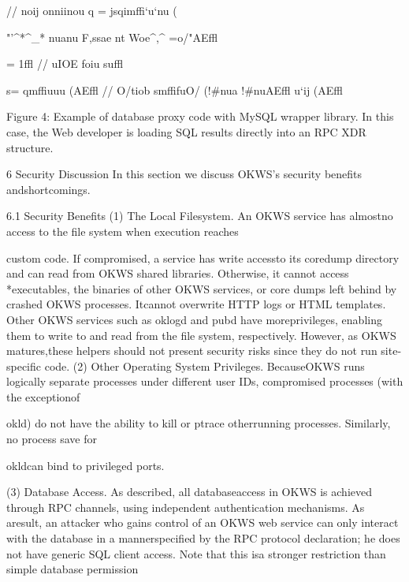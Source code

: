 // \Lambda n\Phi  o\Phi ij o\Lambda \Lambda \Theta \Delta  n\Gamma  \Upsilon \Phi \Upsilon \Gamma \Upsilon ni\Upsilon in\Gamma \Upsilon o\Phi  \Gamma \Upsilon \Omega u
q = \Omega jsqimffi`\Delta u`n\Delta u (

"'^*^_* n\Psi ua\Phi n\Omega u F,ssae \Gamma nt Woe^,^ \Upsilon \Sigma =o/"AEffl

\Upsilon \Sigma  = 1ffl // \Psi u\Gamma  IOE f\Delta o\Omega  \Lambda i\Upsilon u\Phi \Gamma 
\Theta su\Delta \Xi \Pi \Sigma \Delta \Xi \Gamma  \Theta ffl

s\Gamma \Omega \Gamma  = qmffiu\Pi u\Lambda \Theta \Gamma u (\Upsilon \Sigma AEffl // \Omega \Upsilon \Psi O/\Gamma  tio\Lambda b
s\Gamma \Omega \Gamma mffifu\Gamma \Lambda O/ (!\Theta #n\Psi ua !\Theta #\Phi n\Omega uAEffl
\Delta u`ij (\Theta AEffl

Figure 4: Example of database proxy code with MySQL wrapper library. In this case, the Web developer is loading SQL
results directly into an RPC XDR structure.

6 Security Discussion
In this section we discuss OKWS's security benefits andshortcomings.

6.1 Security Benefits
(1) The Local Filesystem. An OKWS service has almostno access to the file system when execution reaches

custom code. If compromised, a service has write accessto its coredump directory and can read from OKWS
shared libraries. Otherwise, it cannot access *executables, the binaries of other OKWS services, or
core dumps left behind by crashed OKWS processes. Itcannot overwrite HTTP logs or HTML templates. Other
OKWS services such as oklogd and pubd have moreprivileges, enabling them to write to and read from the
file system, respectively. However, as OKWS matures,these helpers should not present security risks since they
do not run site-specific code.
(2) Other Operating System Privileges. BecauseOKWS runs logically separate processes under different
user IDs, compromised processes (with the exceptionof

okld) do not have the ability to kill or ptrace otherrunning processes. Similarly, no process save for

okldcan bind to privileged ports.

(3) Database Access. As described, all databaseaccess in OKWS is achieved through RPC channels,
using independent authentication mechanisms. As aresult, an attacker who gains control of an OKWS web
service can only interact with the database in a mannerspecified by the RPC protocol declaration; he does
not have generic SQL client access. Note that this isa stronger restriction than simple database permission

